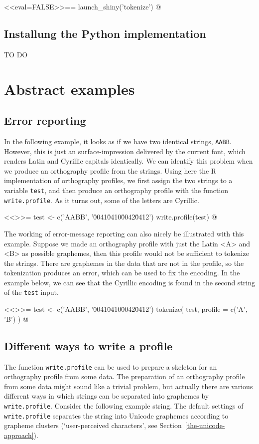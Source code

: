 <<eval=FALSE>>==
launch_shiny('tokenize')
@

\subsection*{Installung the Python implementation}

TO DO

\section{Abstract examples}

\subsection*{Error reporting}

In the following example, it looks as if we have two identical strings,
\texttt{AABB}. However, this is just an surface-impression delivered by the
current font, which renders Latin and Cyrillic capitals identically. We can
identify this problem when we produce an orthography profile from the strings.
Using here the R implementation of orthography profiles, we first assign the two
strings to a variable \texttt{test}, and then produce an orthography profile
with the function \texttt{write.profile}. As it turns out, some of the letters 
are Cyrillic.

<<>>=
test <- c('AABB', '\u0041\u0410\u0042\u0412')
write.profile(test)
@

\noindent The working of error-message reporting can also nicely be illustrated with this
example. Suppose we made an orthography profile with just the Latin <A> and <B> 
as possible graphemes, then this profile would not be sufficient to tokenize the 
strings. There are graphemes in the data that are not in the profile, so the 
tokenization produces an error, which can be used to fix the encoding. In the 
example below, we can see that the Cyrillic encoding is found in the second 
string of the \texttt{test} input.

<<>>=
test <- c('AABB', '\u0041\u0410\u0042\u0412')
tokenize( test, profile = c('A', 'B') )
@

\subsection*{Different ways to write a profile}

The function \texttt{write.profile} can be used to prepare a skeleton for an
orthography profile from some data. The preparation of an orthography profile
from some data might sound like a trivial problem, but actually there are
various different ways in which strings can be separated into graphemes by
\texttt{write.profile}. Consider the following example string. The default
settings of \texttt{write.profile} separates the string into Unicode graphemes
according to grapheme clusters (`user-perceived characters', see
Section~\ref{the-unicode-approach}).

